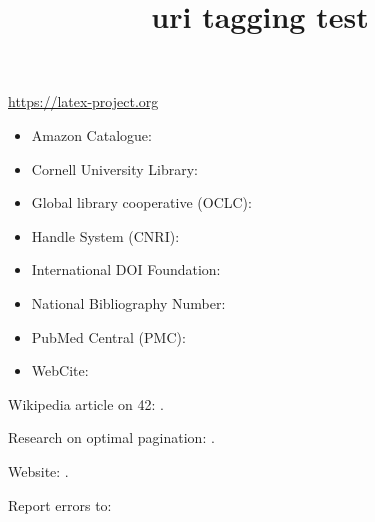 \documentclass{article}
\title{uri tagging test}
\begin{document}
\url{https://latex-project.org} %

\begin{itemize}
\item Amazon Catalogue:             \hfill {}
\item Cornell University Library:   \hfill {}
\item Global library cooperative (OCLC):   \hfill {}
\item Handle System (CNRI):         \hfill {}
\item International DOI Foundation: \hfill {}
\item National Bibliography Number: \hfill {}
\item PubMed Central (PMC):         \hfill {}
\item WebCite:                      \hfill {}
\end{itemize}



Wikipedia article on 42:        .

Research on optimal pagination: .

Website:          .

Report errors to:          
\end{document}
